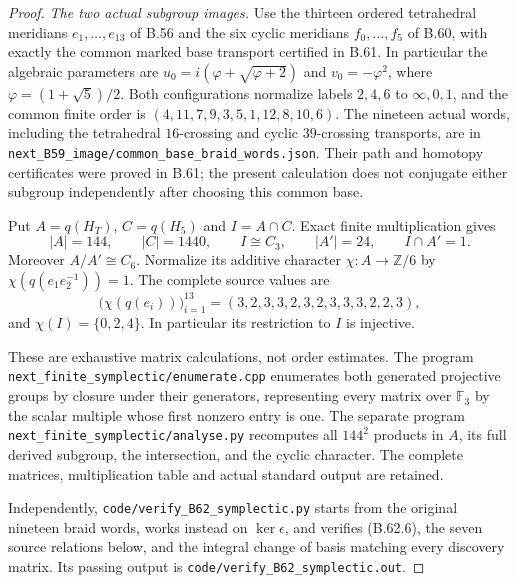 \begin{proof}
\emph{The two actual subgroup images.}
Use the thirteen ordered tetrahedral meridians
$e_1,\ldots,e_{13}$ of B.56 and the six cyclic meridians
$f_0,\ldots,f_5$ of B.60, with exactly the common marked
base transport certified in B.61.
In particular the algebraic parameters are
$u_0=i(\varphi+\sqrt{\varphi+2})$ and $v_0=-\varphi^2$,
where $\varphi=(1+\sqrt5)/2$.
Both configurations normalize labels $2,4,6$ to
$\infty,0,1$, and the common finite order is
$(4,11,7,9,3,5,1,12,8,10,6)$.
The nineteen actual words, including the tetrahedral
$16$-crossing and cyclic $39$-crossing transports, are in
\nolinkurl{next_B59_image/common_base_braid_words.json}.
Their path and homotopy certificates were proved in B.61;
the present calculation does not conjugate either subgroup
independently after choosing this common base.

Put $A=q(H_T)$, $C=q(H_5)$ and $I=A\cap C$.
Exact finite multiplication gives
\[
 |A|=144,\qquad |C|=1440,\qquad I\cong C_3,
 \qquad |A'|=24,\qquad I\cap A'=1.                           \tag{B.62.6}
\]
Moreover $A/A'\cong C_6$.
Normalize its additive character
$\chi:A\to\mathbb Z/6$ by
$\chi(q(e_1e_2^{-1}))=1$.
The complete source values are
\[
 \bigl(\chi(q(e_i))\bigr)_{i=1}^{13}
       =(3,2,3,3,2,3,2,3,3,3,2,2,3),                       \tag{B.62.7}
\]
and $\chi(I)=\{0,2,4\}$.
In particular its restriction to $I$ is injective.

These are exhaustive matrix calculations, not order
estimates.  The program
\nolinkurl{next_finite_symplectic/enumerate.cpp}
enumerates both generated projective groups by closure
under their generators, representing every matrix over
$\mathbb F_3$ by the scalar multiple whose first nonzero
entry is one.
The separate program
\nolinkurl{next_finite_symplectic/analyse.py}
recomputes all $144^2$ products in $A$, its full derived
subgroup, the intersection, and the cyclic character.
The complete matrices, multiplication table and actual
standard output are retained.

Independently,
\nolinkurl{code/verify_B62_symplectic.py}
starts from the original nineteen braid words, works
instead on $\ker\epsilon$, and verifies (B.62.6), the
seven source relations below, and the integral change of
basis matching every discovery matrix.
Its passing output is
\nolinkurl{code/verify_B62_symplectic.out}.


\end{proof}
